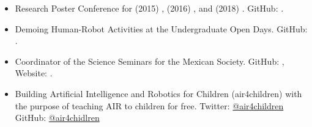 \documentclass{mycv}
\begin{document}
\begin{itemize}
\item Research Poster Conference for 
(2015) \href{https://github.com/mxochicale/PhD/blob/master/posters/Research_Poster_Conference_UoB/2015/poster/poster.pdf}{\faImage}, 
(2016) \href{https://github.com/mxochicale/PhD/blob/master/posters/Research_Poster_Conference_UoB/2016/poster/poster.pdf}{\faImage}, and  
(2018) \href{https://github.com/mxochicale/PhD/blob/master/posters/Research_Poster_Conference_UoB/2018/poster/main/map479-poster-uob2018.pdf}{\faImage}.
GitHub: \href{https://github.com/mxochicale/PhD/tree/master/posters/Research_Poster_Conference_UoB}{\faGithubAlt}.
\item Demoing Human-Robot Activities at the Undergraduate Open Days. GitHub: \href{https://github.com/mxochicale/opendayuob-hridemo}{\faGithubAlt}. 
\item Coordinator of the Science Seminars for the Mexican Society.  GitHub: \href{https://github.com/MexicanSocietyUoB}{\faGithubAlt}, Website: \href{https://mexicansocietyuob.github.io/seminars/}{\faExternalLink}. 




\item Building Artificial Intelligence and Robotics for Children (air4children) with the purpose of teaching AIR to children for free. 
Twitter: \href{https://twitter.com/air4children}{\faTwitter @air4children} 
GitHub: \href{https://github.com/air4children}{\faGithubAlt @air4chidlren} 



\end{itemize}
\end{document}
